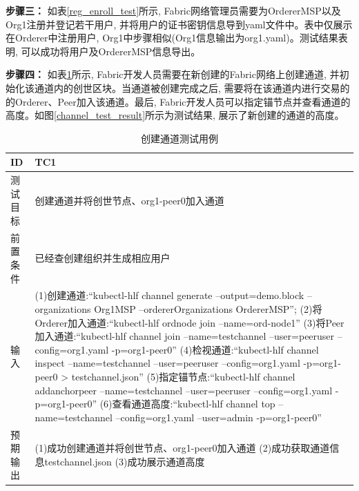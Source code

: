 \textbf{步骤三：} 如表\ref{reg_enroll_test}所示, Fabric网络管理员需要为OrdererMSP以及Org1注册并登记若干用户, 并将用户的证书密钥信息导到yaml文件中。表中仅展示在Orderer中注册用户, Org1中步骤相似(Org1信息输出为org1.yaml)。测试结果表明, 可以成功将用户及OrdererMSP信息导出。


\textbf{步骤四：} 如表\ref{channel_test}所示, Fabric开发人员需要在新创建的Fabric网络上创建通道, 并初始化该通道内的创世区块。当通道被创建完成之后, 需要将在该通道内进行交易的的Orderer、Peer加入该通道。最后, Fabric开发人员可以指定锚节点并查看通道的高度。如图\ref{channel_test_result}所示为测试结果, 展示了新创建的通道的高度。

{\footnotesize
\begin{longtable}[h]{m{60pt}|m{280pt}}
    \caption[创建通道测试用例]{创建通道测试用例} \label{channel_test}\\
        \hline  
        ID&TC1\\
        \hline
        测试目标&创建通道并将创世节点、org1-peer0加入通道\\
        \hline
        前置条件&已经查创建组织并生成相应用户\\
        \hline
        输入& (1)创建通道:“kubectl-hlf channel generate --output=demo.block --organizations Org1MSP --ordererOrganizations OrdererMSP”;
        \newline (2)将Orderer加入通道:“kubectl-hlf ordnode join --name=ord-node1”
        \newline (3)将Peer加入通道:“kubectl-hlf channel join --name=testchannel --user=peeruser --config=org1.yaml -p=org1-peer0”
        \newline (4)检视通道:“kubectl-hlf channel inspect --name=testchannel --user=peeruser --config=org1.yaml -p=org1-peer0 > testchannel.json”
        \newline (5)指定锚节点:“kubectl-hlf channel addanchorpeer --name=testchannel --user=peeruser --config=org1.yaml -p=org1-peer0”
        \newline (6)查看通道高度:“kubectl-hlf channel top --name=testchannel --config=org1.yaml --user=admin -p=org1-peer0”\\

        \hline 
        预期输出& (1)成功创建通道并将创世节点、org1-peer0加入通道
        \newline (2)成功获取通道信息testchannel.json
        \newline (3)成功展示通道高度\\
        \hline
    \end{longtable} 
}

